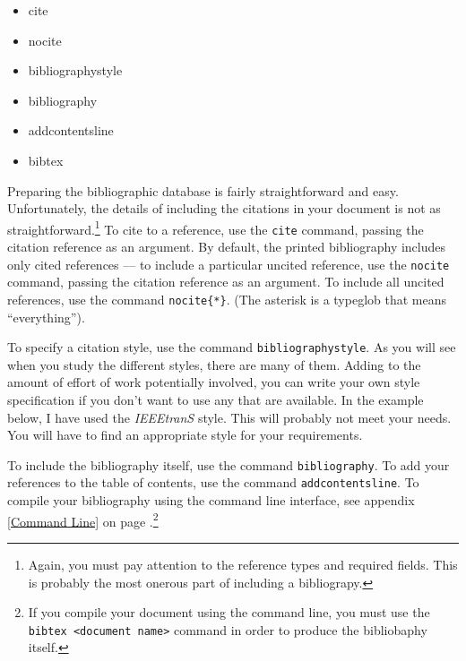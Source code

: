         \begin{framed}
            \begin{itemize}
                \item{cite}
                \item{nocite}
                \item{bibliographystyle}
                \item{bibliography}
                \item{addcontentsline}
                \item{bibtex}
            \end{itemize}
        \end{framed}

        Preparing the bibliographic database is fairly straightforward and easy. Unfortunately, the details of including the citations in your document is not as straightforward.\footnote{Again, you must pay attention to the reference types and required fields. This is probably the most onerous part of including a bibliograpy.} To cite to a reference, use the \texttt{cite} command, passing the citation reference as an argument. By default, the printed bibliography includes only cited references --- to include a particular uncited reference, use the \texttt{nocite} command, passing the citation reference as an argument. To include all uncited references, use the command \texttt{nocite\{*\}}. (The asterisk is a typeglob that means ``everything'').

        To specify a citation style, use the command \texttt{bibliographystyle}. As you will see when you study the different styles, there are many of them. Adding to the amount of effort of work potentially involved, you can write your own style specification if you don't want to use any that are available. In the example below, I have used the \textit{IEEEtranS} style. This will probably not meet your needs. You will have to find an appropriate style for your requirements.

        To include the bibliography itself, use the command \texttt{bibliography}. To add your references to the table of contents, use the command \texttt{addcontentsline}. To compile your bibliography using the command line interface, see appendix \ref{Command Line} on page \pageref{Command Line}.\footnote{If you compile your document using the command line, you must use the \texttt{bibtex <document name>} command in order to produce the bibliobaphy itself.}
        
